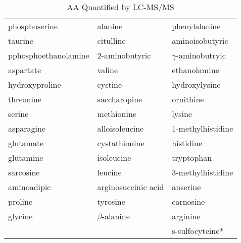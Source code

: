 \documentclass{scrartcl}
\begin{document}
\begin{enumerate}
\begin{table}[htbp]
\caption{\label{tab:org141a962}
AA Quantified by LC-MS/MS}
\centering
\begin{tabular}{lll}
phosphoserine & alanine & phenylalanine\\
taurine & citulline & aminoisobutyric\\
pphosphoethanolamine & 2-aminobutyric & \(\gamma\)-aminobutryic\\
aspartate & valine & ethanolamine\\
hydroxyproline & cystine & hydroxylysine\\
threonine & saccharopine & ornithine\\
serine & methionine & lysine\\
asparagine & alloisoleucine & 1-methylhistidine\\
glutamate & cystathionine & histidine\\
glutamine & isoleucine & tryptophan\\
sarcosine & leucine & 3-methylhistidine\\
aminoadipic & arginosuccinic acid & anserine\\
proline & tyrosine & carnosine\\
glycine & \(\beta\)-alanine & arginine\\
 &  & s-sulfocyteine*\\
\end{tabular}
\end{table}


\end{enumerate}
\end{document}
